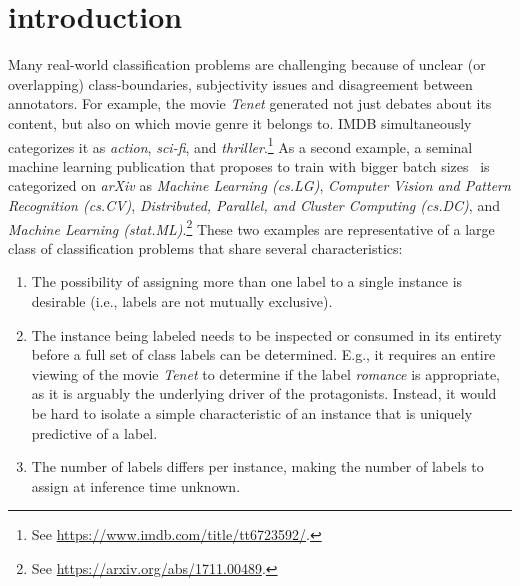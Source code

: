 
\section{introduction}
\label{sec:org662677c}


Many real-world classification problems are challenging because of unclear (or overlapping) class-boundaries, subjectivity issues and disagreement between annotators.
For example, the movie \textit{Tenet} generated not just debates about its content, but also on which movie genre it belongs to. IMDB simultaneously categorizes it as \textit{action}, \textit{sci-fi}, and \textit{thriller}.\footnote{See \url{https://www.imdb.com/title/tt6723592/}.}
As a second example, a seminal machine learning publication that proposes to train with bigger batch sizes~\citep{bigBSArxiv} is categorized on \textit{arXiv} as \textit{Machine Learning (cs.LG)},
\textit{Computer Vision and Pattern Recognition (cs.CV)}, \textit{Distributed,
Parallel, and Cluster Computing (cs.DC)}, and \textit{Machine Learning
(stat.ML)}.\footnote{See \url{https://arxiv.org/abs/1711.00489}.}
These two examples are representative of a large class of classification problems that share several characteristics:
\begin{enumerate}[label=(\arabic*),leftmargin=*]
\item The possibility of assigning more than one label to a single instance is desirable (i.e., labels are not mutually exclusive).
\item The instance being labeled needs to be inspected or consumed in its entirety before a full set of class labels can be determined. E.g., it requires an entire viewing of the movie \textit{Tenet} to determine if the label \textit{romance} is appropriate, as it is arguably the underlying driver of the protagonists. Instead, it would be hard to isolate a simple characteristic of an instance that is uniquely predictive of a label.
\item The number of labels differs per instance, making the number of labels to assign at inference time unknown.
\end{enumerate}

